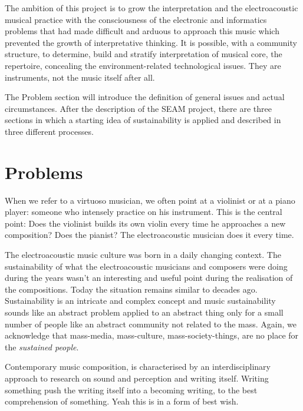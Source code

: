 \documentclass[twoside,a4paper]{article}
\begin{document}
The ambition of this project is to grow the interpretation and the electroacoustic musical practice with the consciousness of the electronic and informatics problems that had made difficult and arduous to approach this music which prevented the growth of interpretative thinking. It is possible, with a community structure, to determine, build and stratify interpretation of musical core, the repertoire, concealing the environment-related technological issues. They are instruments, not the music itself after all.

The Problem section will introduce the definition of general issues and actual circumstances. After the description of the SEAM project, there are three sections in which a starting idea of sustainability is applied and described in three different processes.


\section{Problems}
\label{sec:problems}

When we refer to a virtuoso musician, we often point at a violinist or at a piano player: someone who intensely practice on his instrument. This is the central point: Does the violinist builds its own violin every time he approaches a new composition? Does the pianist? The electroacoustic musician does it every time.

The electroacoustic music culture was born in a daily changing context. The sustainability of what the electroacoustic musicians and composers were doing during the years wasn't an interesting and useful point during the realisation of the compositions. Today the situation remains similar to decades ago. Sustainability is an intricate and complex concept and music sustainability sounds like an abstract problem applied to an abstract thing only for a small number of people like an abstract community not related to the mass. Again, we acknowledge that mass-media, mass-culture, mass-society-things, are no place for the \emph{sustained people}.

Contemporary music composition, is characterised by an interdisciplinary approach to research on sound and perception and writing itself. Writing something push the writing itself into a becoming writing, to the best comprehension of something. Yeah this is in a form of best wish.
\end{document}
